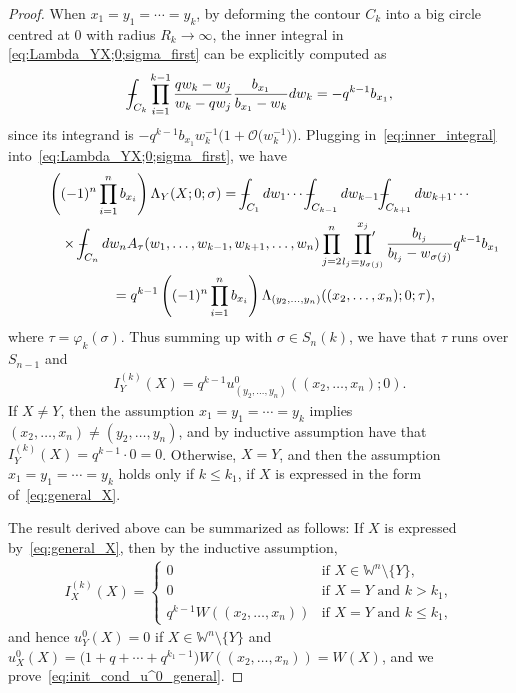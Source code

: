 \documentclass[11pt]{article}
\numberwithin{equation}{section}
\def\Xint#1{\mathchoice
{\XXint\displaystyle\textstyle{#1}}%
{\XXint\textstyle\scriptstyle{#1}}%
{\XXint\scriptstyle\scriptscriptstyle{#1}}%
{\XXint\scriptscriptstyle\scriptscriptstyle{#1}}%
\!\int}
\def\XXint#1#2#3{{\setbox0=\hbox{$#1{#2#3}{\int}$}
\vcenter{\hbox{$#2#3$}}\kern-.5\wd0}}
\def\dashint{\Xint-}
\newcommand{\prodprime}{\sideset{}{'}\prod}
\newcommand{\Weylchamber}{\mathbb{W}}
\newcommand{\bigO}{\mathcal{O}}
\begin{document}
\begin{proof}
 When $x_1 = y_1 = \dotsb = y_k$, by deforming the contour $C_k$ into a big circle centred at $0$ with radius $R_k \to \infty$, the inner integral in \eqref{eq:Lambda_YX;0;sigma_first} can be explicitly computed as
 \begin{gather} \label{eq:inner_integral}
 \dashint_{C_k} \prod^{k - 1}_{i = 1} \frac{q w_k - w_j}{w_k - q w_j} \frac{b_{x_1}}{b_{x_1} - w_k} dw_k = -q^{k - 1} b_{x_1},
 \end{gather}
 since its integrand is $-q^{k - 1} b_{x_1} w^{-1}_k \big(1 + \bigO\big(w^{-1}_k\big)\big)$. Plugging in~\eqref{eq:inner_integral} into~\eqref{eq:Lambda_YX;0;sigma_first}, we have
 \begin{gather}
   \left( (-1)^n \prod^n_{i = 1} b_{x_i} \right) \Lambda_Y(X; 0; \sigma)
 =  \dashint_{C_1} dw_1 \dotsi \dashint_{C_{k - 1}} dw_{k - 1} \dashint_{C_{k + 1}} dw_{k + 1} \dotsi \nonumber\\
 \qquad\quad{}\times \dashint_{C_n} dw_n A_{\tau}(w_1, \dotsc, w_{k - 1}, w_{k + 1}, \dotsc, w_n)  \prod^n_{j = 2} \prodprime^{x_j}_{l_j = y_{\sigma(j)}} \frac{b_{l_j}}{b_{l_j} - w_{\sigma(j)}} q^{k - 1} b_{x_1} \nonumber\\
\qquad{}
 =  q^{k - 1} \left( (-1)^n \prod^n_{i = 1} b_{x_i} \right) \Lambda_{(y_2, \dotsc, y_n)}((x_2, \dotsc, x_n); 0; \tau),\label{eq:evanluation_x_1=y_k}
  \end{gather}
 where $\tau = \varphi_k(\sigma)$. Thus summing up with $\sigma \in S_n(k)$, we have that $\tau$ runs over $S_{n - 1}$ and
 \begin{gather*} %
 I^{(k)}_Y(X) = q^{k - 1} u^0_{(y_2, \dotsc, y_n)}((x_2, \dotsc, x_n); 0).
 \end{gather*}
 If $X \neq Y$, then the assumption $x_1 = y_1 = \dotsb = y_k$ implies $(x_2, \dotsc, x_n) \neq (y_2, \dotsc, y_n)$, and by inductive assumption have that $I^{(k)}_Y(X) = q^{k - 1} \cdot 0 = 0$. Otherwise, $X = Y$, and then the assumption $x_1 = y_1 = \dotsb = y_k$ holds only if $k \leq k_1$, if $X$ is expressed in the form of~\eqref{eq:general_X}.

 The result derived above can be summarized as follows: If $X$ is expressed by~\eqref{eq:general_X}, then by the inductive assumption,
 \begin{gather*}
 I^{(k)}_X(X) =
 \begin{cases}
 0 & \text{if $X \in \Weylchamber^n {\setminus} \{ Y \}$}, \\
 0 & \text{if $X = Y$ and $k > k_1$}, \\
 q^{k - 1} W((x_2, \dotsc, x_n)) & \text{if $X = Y$ and $k \leq k_1$},
 \end{cases}
 \end{gather*}
 and hence $u^0_Y(X) = 0$ if $X \in \Weylchamber^n {\setminus} \{ Y \}$ and $u^0_X(X) = \big(1 + q + \dotsb + q^{k_1 - 1}\big) W((x_2, \dotsc, x_n)) = W(X)$, and we prove~\eqref{eq:init_cond_u^0_general}.
\end{proof}
\end{document}
